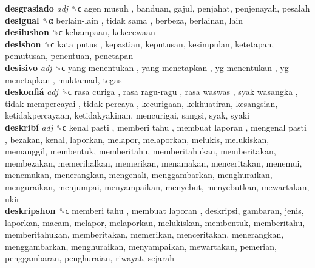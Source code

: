 \textbf{desgrasiado} \emph{adj}  ␝ϲ   agen musuh , banduan, gajul, penjahat, penjenayah, pesalah  \\
\textbf{desigual} ␝α   berlain-lain ,  tidak sama , berbeza, berlainan, lain  \\
\textbf{desilushon} ␝ϲ  kehampaan, kekecewaan  \\
\textbf{desishon} ␝ϲ   kata putus , kepastian, keputusan, kesimpulan, ketetapan, pemutusan, penentuan, penetapan  \\
\textbf{desisivo} \emph{adj}  ␝ϲ   yang menentukan ,  yang menetapkan ,  yg menentukan ,  yg menetapkan , muktamad, tegas  \\
\textbf{deskonfiá} \emph{adj}  ␝ϲ   rasa curiga ,  rasa ragu-ragu ,  rasa waswas ,  syak wasangka ,  tidak mempercayai ,  tidak percaya , kecurigaan, kekhuatiran, kesangsian, ketidakpercayaan, ketidakyakinan, mencurigai, sangsi, syak, syaki  \\
\textbf{deskribí} \emph{adj}  ␝ϲ   kenal pasti ,  memberi tahu ,  membuat laporan ,  mengenal pasti , bezakan, kenal, laporkan, melapor, melaporkan, melukis, melukiskan, memanggil, membentuk, memberitahu, memberitahukan, memberitakan, membezakan, memerihalkan, memerikan, menamakan, menceritakan, menemui, menemukan, menerangkan, mengenali, menggambarkan, menghuraikan, menguraikan, menjumpai, menyampaikan, menyebut, menyebutkan, mewartakan, ukir  \\
\textbf{deskripshon} ␝ϲ   memberi tahu ,  membuat laporan , deskripsi, gambaran, jenis, laporkan, macam, melapor, melaporkan, melukiskan, membentuk, memberitahu, memberitahukan, memberitakan, memerikan, menceritakan, menerangkan, menggambarkan, menghuraikan, menyampaikan, mewartakan, pemerian, penggambaran, penghuraian, riwayat, sejarah  \\

